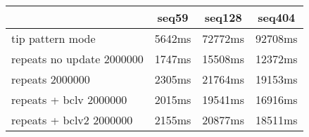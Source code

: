 \begin{tabular}{|l|c|c|c|}
\hline
 & seq59 & seq128 & seq404  \\
\hline
tip pattern mode &  5642ms &  72772ms &  92708ms\\
\hline
repeats no update 2000000 &  1747ms &  15508ms &  12372ms\\
\hline
repeats 2000000 &  2305ms &  21764ms &  19153ms\\
\hline
repeats + bclv 2000000 &  2015ms &  19541ms &  16916ms\\
\hline
repeats + bclv2 2000000 &  2155ms &  20877ms &  18511ms\\
\hline
\end{tabular}
